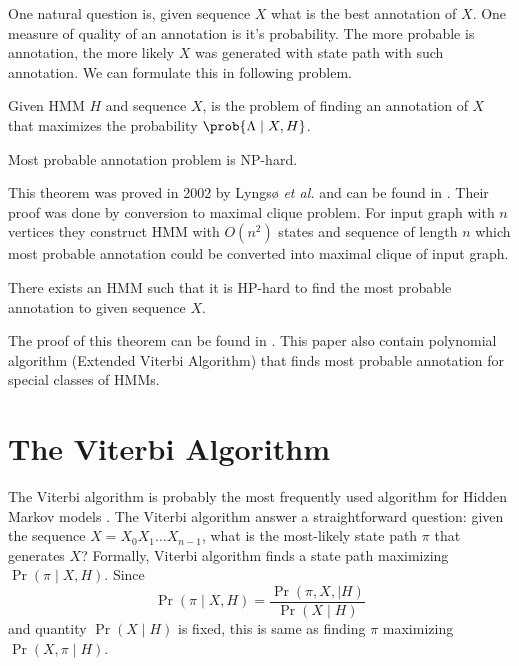 One natural question is, given sequence $X$ what is the best annotation of $X$.
One measure of quality of an annotation is it's probability. The more probable
is annotation, the more likely $X$ was generated with state path with such
annotation. We can formulate this in following problem.

\begin{definition}
Given HMM $H$ and sequence $X$,  is the problem of finding an annotation of $X$ that maximizes
the probability $\prob{\Lambda\mid X,H}$.
\end{definition}

\begin{theorem}
Most probable annotation problem is NP-hard.
\end{theorem}
This theorem was proved in 2002 by Lyngsø {\it et al.} and can be found in
\cite{Lyngso2002}. Their proof was done by conversion to maximal clique problem.
For input graph with $n$ vertices they construct HMM with $O(n^2)$ states and
sequence of length $n$ which most probable annotation could be converted into
maximal clique of input graph. 

\begin{theorem}
There exists an HMM such that it is HP-hard to find the most probable annotation
to given sequence $X$.
\end{theorem}
The proof of this theorem can be found in \cite{Brejova2007mpa}. This paper also
contain polynomial algorithm (Extended Viterbi Algorithm) that finds most
probable annotation for special classes of HMMs. 



\section{The Viterbi Algorithm}
The Viterbi algorithm  is probably the most frequently used
 algorithm for Hidden Markov
models \cite{Durbin1998}.
The Viterbi algorithm answer a straightforward question: given the sequence
$X=X_0X_1\dots X_{n-1}$, what
is the most-likely state path $\pi$ that generates $X$? Formally, Viterbi
algorithm finds a state path maximizing $\Pr\left( \pi\mid X,H \right)$. Since
\[\Pr\left(\pi\mid X,H\right) = \frac{\Pr\left(\pi,X,\mid
H\right)}{\Pr\left(X\mid H\right)}\] and quantity $\Pr\left(X\mid H\right)$ is
fixed,
this is same as finding $\pi$ maximizing $\Pr\left(X,\pi\mid H\right)$. 

